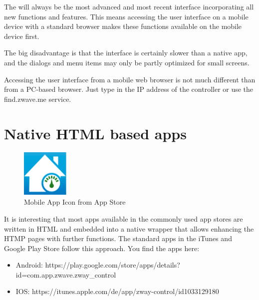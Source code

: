 The \zwshui will always be the most advanced and most recent interface 
incorporating all new functions and features. This means accessing the user interface 
on a mobile device with a standard browser makes these functions available on the 
mobile device first.

The big disadvantage is that the interface is certainly slower than a native app, and the 
dialogs and menu items may only be partly optimized for small screens.

Accessing the user interface from a mobile web browser is not much different than from a 
PC-based browser. Just type in the IP address of the controller or use the find.zwave.me service.

\section{Native HTML based apps}

\begin{figure}
\begin{center}
\includegraphics[width=0.2\textwidth]{pngs/cap5/mobile2.png}
\caption{Mobile App Icon from App Store}
\label{mobile2}
\end{center}
\end{figure}

It is interesting that most apps available in the commonly used app stores are written 
in HTML and embedded into a native wrapper that allows enhancing the HTMP pages with 
further functions. The standard \zway apps in the iTunes and Google Play Store follow 
this approach. You find the apps here:

\begin{itemize}
\item Android: https://play.google.com/store/apps/details? id=com.app.zwave.zway\_control
\item IOS: https://itunes.apple.com/de/app/zway-control/id1033129180
\end{itemize}


